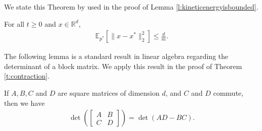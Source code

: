 We state this Theorem by \citet{durmus} used in the proof of Lemma \ref{l:kineticenergyisbounded}.
\begin{theorem}\citep[Theorem 1 in][]{durmus} \label{t:xvariance} For all $t\ge 0$ and $x\in \mathbb{R}^d$,
\begin{align*}
\mathbb{E}_{p^*}\left[ \lVert x - x^* \rVert_2^2 \right] \le \frac{d}{m}.
\end{align*}
\end{theorem}

The following lemma is a standard result in linear algebra regarding the determinant of a block matrix. We apply this result in the proof of Theorem \ref{t:contraction}. 
\begin{lemma}\citep[Theorem 3 in][]{dets} \label{t:blockmatrix} If $A,B,C$ and $D$ are square matrices of dimension $d$, and $C$ and $D$ commute, then we have 
\begin{align*}
\det\left(\begin{bmatrix}
  A & B \\
  C & D
 \end{bmatrix} \right) = \det(AD - BC).
\end{align*}
\end{lemma}

